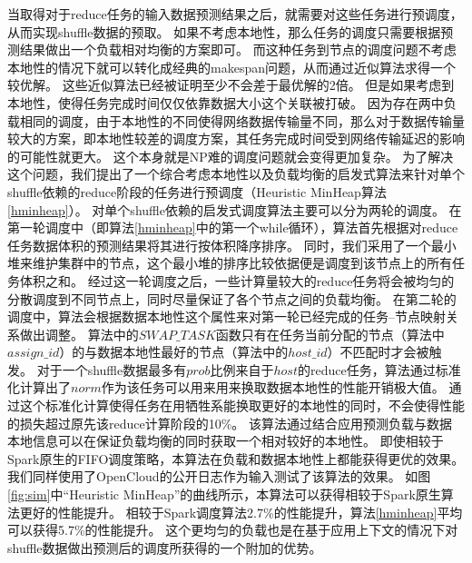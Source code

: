 当取得对于reduce任务的输入数据预测结果之后，就需要对这些任务进行预调度，从而实现shuffle数据的预取。
如果不考虑本地性，那么任务的调度只需要根据预测结果做出一个负载相对均衡的方案即可。
而这种任务到节点的调度问题不考虑本地性的情况下就可以转化成经典的makespan问题，从而通过近似算法求得一个较优解\cite{approximation}。
这些近似算法已经被证明至少不会差于最优解的2倍。
但是如果考虑到本地性，使得任务完成时间仅仅依靠数据大小这个关联被打破。
因为存在两中负载相同的调度，由于本地性的不同使得网络数据传输量不同，那么对于数据传输量较大的方案，即本地性较差的调度方案，其任务完成时间受到网络传输延迟的影响的可能性就更大。
这个本身就是NP难的调度问题就会变得更加复杂。
为了解决这个问题，我们提出了一个综合考虑本地性以及负载均衡的启发式算法来针对单个shuffle依赖的reduce阶段的任务进行预调度（Heuristic MinHeap算法\ref{hminheap}）。
对单个shuffle依赖的启发式调度算法主要可以分为两轮的调度。
在第一轮调度中（即算法\ref{hminheap}中的第一个while循环），算法首先根据对reduce任务数据体积的预测结果将其进行按体积降序排序。
同时，我们采用了一个最小堆来维护集群中的节点，这个最小堆的排序比较依据便是调度到该节点上的所有任务体积之和。
经过这一轮调度之后，一些计算量较大的reduce任务将会被均匀的分散调度到不同节点上，同时尽量保证了各个节点之间的负载均衡。
在第二轮的调度中，算法会根据数据本地性这个属性来对第一轮已经完成的任务--节点映射关系做出调整。
算法中的$SWAP\_TASK$函数只有在任务当前分配的节点（算法中$assign\_id$）的与数据本地性最好的节点（算法中的$host\_id$）不匹配时才会被触发。
对于一个shuffle数据最多有$prob$比例来自于$host$的reduce任务，算法通过标准化计算出了$norm$作为该任务可以用来用来换取数据本地性的性能开销极大值。
通过这个标准化计算使得任务在用牺牲系能换取更好的本地性的同时，不会使得性能的损失超过原先该reduce计算阶段的10\%。
该算法通过结合应用预测负载与数据本地信息可以在保证负载均衡的同时获取一个相对较好的本地性。
即使相较于Spark原生的FIFO调度策略\cite{sparksource}，本算法在负载和数据本地性上都能获得更优的效果。
我们同样使用了OpenCloud的公开日志作为输入测试了该算法的效果。
如图\ref{fig:sim}中“Heuristic MinHeap”的曲线所示，本算法可以获得相较于Spark原生算法更好的性能提升。
相较于Spark调度算法2.7\%的性能提升，算法\ref{hminheap}平均可以获得5.7\%的性能提升。
这个更均匀的负载也是在基于应用上下文的情况下对shuffle数据做出预测后的调度所获得的一个附加的优势。

